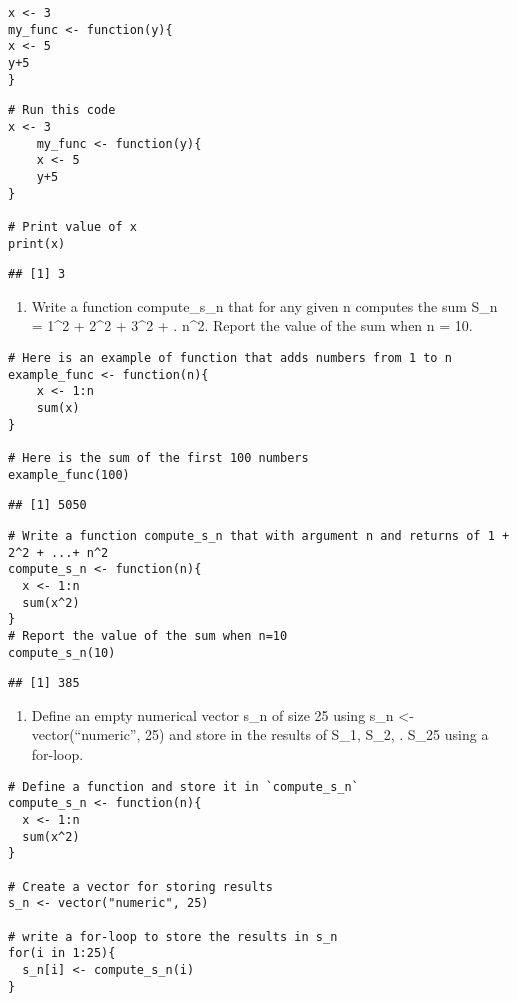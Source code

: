 \documentclass[]{article}
\providecommand{\tightlist}{%
  \setlength{\itemsep}{0pt}\setlength{\parskip}{0pt}}
\begin{document}
\begin{verbatim}
x <- 3
my_func <- function(y){
x <- 5
y+5
}
\end{verbatim}

\begin{verbatim}
# Run this code 
x <- 3
    my_func <- function(y){
    x <- 5
    y+5
}

# Print value of x 
print(x)
\end{verbatim}

\begin{verbatim}
## [1] 3
\end{verbatim}

\begin{enumerate}
\def\labelenumi{\arabic{enumi}.}
\setcounter{enumi}{6}
\tightlist
\item
  Write a function compute\_s\_n that for any given n computes the sum
  S\_n = 1\^{}2 + 2\^{}2 + 3\^{}2 + . n\^{}2. Report the value of the
  sum when n = 10.
\end{enumerate}

\begin{verbatim}
# Here is an example of function that adds numbers from 1 to n
example_func <- function(n){
    x <- 1:n
    sum(x)
}

# Here is the sum of the first 100 numbers
example_func(100)
\end{verbatim}

\begin{verbatim}
## [1] 5050
\end{verbatim}

\begin{verbatim}
# Write a function compute_s_n that with argument n and returns of 1 + 2^2 + ...+ n^2
compute_s_n <- function(n){
  x <- 1:n
  sum(x^2)
}
# Report the value of the sum when n=10
compute_s_n(10)
\end{verbatim}

\begin{verbatim}
## [1] 385
\end{verbatim}

\begin{enumerate}
\def\labelenumi{\arabic{enumi}.}
\setcounter{enumi}{7}
\tightlist
\item
  Define an empty numerical vector s\_n of size 25 using s\_n
  \textless{}- vector(``numeric'', 25) and store in the results of S\_1,
  S\_2, . S\_25 using a for-loop.
\end{enumerate}

\begin{verbatim}
# Define a function and store it in `compute_s_n`
compute_s_n <- function(n){
  x <- 1:n
  sum(x^2)
}

# Create a vector for storing results
s_n <- vector("numeric", 25)

# write a for-loop to store the results in s_n
for(i in 1:25){
  s_n[i] <- compute_s_n(i)
}
\end{verbatim}
\end{document}
